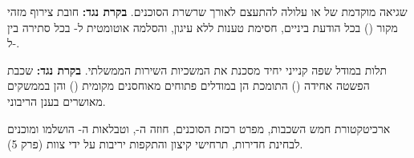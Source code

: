 \begin{riskbox}
שגיאה מוקדמת של  או  עלולה להתעצם לאורך שרשרת הסוכנים.
\textbf{בקרת נגד:} חובת צירוף מזהי מקור () בכל הודעת ביניים, חסימת טענות ללא עיגון, והסלמה אוטומטית ל- בכל סתירה בין  ל-.
\end{riskbox}

\begin{riskbox}
תלות במודל שפה קנייני יחיד מסכנת את המשכיות השירות הממשלתי.
\textbf{בקרת נגד:} שכבת הפשטה אחידה () התומכת הן במודלים פתוחים מאוחסנים מקומית () והן בממשקים מאושרים בענן הריבוני.
\end{riskbox}

\begin{insightbox}
ארכיטקטורת חמש השכבות, מפרט רכזת הסוכנים, חוזה ה-, וטבלאות ה- הושלמו ומוכנים לבחינת חדירות, תרחישי קיצון והתקפות יריבות על ידי צוות  (פרק 5).
\end{insightbox}
